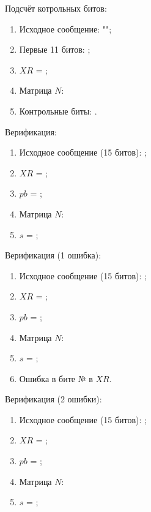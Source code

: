 Подсчёт котрольных битов:
\begin{enumerate}
    \item Исходное сообщение: "";
    \item Первые  11 битов: ;
    \item $XR$ = ;
    \item Матрица $N$: \\
    \item Контрольные биты: .
\end{enumerate}


Верификация:
\begin{enumerate}
    \item Исходное сообщение (15 битов): ;
    \item $XR$ = ;
    \item $pb$ = ;
    \item Матрица $N$: \\
    \item $s$ = ;
\end{enumerate}


Верификация (1 ошибка):
\begin{enumerate}
    \item Исходное сообщение (15 битов): ;
    \item $XR$ = ;
    \item $pb$ = ;
    \item Матрица $N$: \\
    \item $s$ = ;
    \item Ошибка в бите №  в $XR$.
\end{enumerate}


Верификация (2 ошибки):
\begin{enumerate}
    \item Исходное сообщение (15 битов): ;
    \item $XR$ = ;
    \item $pb$ = ;
    \item Матрица $N$: \\
    \item $s$ = ;
\end{enumerate}

